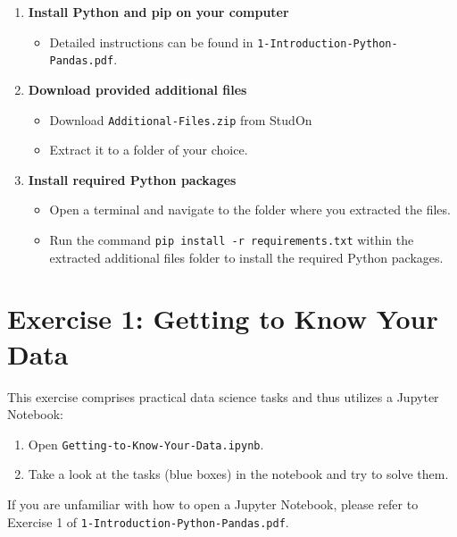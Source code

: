 \documentclass[
english,
smallborders
]{i6prcsht}
\begin{document}
\begin{enumerate}
	\item \textbf{Install Python and pip on your computer}

	      \begin{itemize}
		      \item Detailed instructions can be found in \texttt{1-Introduction-Python-Pandas.pdf}.
	      \end{itemize}

	\item \textbf{Download provided additional files}

	      \begin{itemize}
		      \item Download \texttt{Additional-Files.zip} from StudOn
		      \item Extract it to a folder of your choice.
	      \end{itemize}

	\item \textbf{Install required Python packages}

	      \begin{itemize}
		      \item Open a terminal and navigate to the folder where you extracted the files.
		      \item Run the command \texttt{pip install -r requirements.txt} within the extracted additional files folder to install the required Python packages.
	      \end{itemize}


\end{enumerate}

\section*{Exercise 1: Getting to Know Your Data}

This exercise comprises practical data science tasks and thus utilizes a Jupyter Notebook:

\begin{enumerate}
	\item Open \texttt{Getting-to-Know-Your-Data.ipynb}.
	\item Take a look at the tasks (blue boxes) in the notebook and try to solve them.
\end{enumerate}

If you are unfamiliar with how to open a Jupyter Notebook, please refer to Exercise 1 of \texttt{1-Introduction-Python-Pandas.pdf}.
\end{document}

